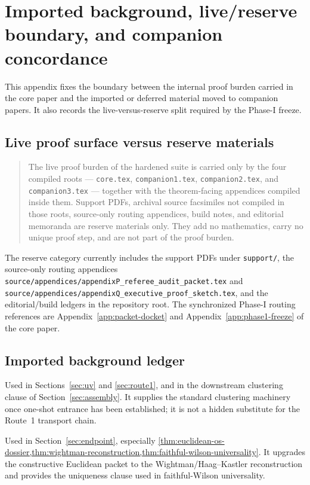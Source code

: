 
\section{Imported background, live/reserve boundary, and companion concordance}\label{app:ledger-concordance}

This appendix fixes the boundary between the internal proof burden carried in the core paper and the imported or deferred material moved to companion papers. It also records the live-versus-reserve split required by the Phase-I freeze.

\subsection*{Live proof surface versus reserve materials}

\begin{quote}\small
The live proof burden of the hardened suite is carried only by the four compiled roots --- \texttt{core.tex}, \texttt{companion1.tex}, \texttt{companion2.tex}, and \texttt{companion3.tex} --- together with the theorem-facing appendices compiled inside them. Support PDFs, archival source facsimiles not compiled in those roots, source-only routing appendices, build notes, and editorial memoranda are reserve materials only. They add no mathematics, carry no unique proof step, and are not part of the proof burden.
\end{quote}

The reserve category currently includes the support PDFs under \texttt{support/}, the source-only routing appendices \texttt{source/appendices/appendixP\_referee\_audit\_packet.tex} and \texttt{source/appendices/appendixQ\_executive\_proof\_sketch.tex}, and the editorial/build ledgers in the repository root. The synchronized Phase-I routing references are Appendix~\ref{app:packet-docket} and Appendix~\ref{app:phase1-freeze} of the core paper.

\subsection*{Imported background ledger}
\begin{description}[leftmargin=2.2em,style=nextline]
\item[KP/Dobrushin entrance-to-clustering package.] Used in Sections~\ref{sec:uv} and \ref{sec:route1}, and in the downstream clustering clause of Section~\ref{sec:assembly}. It supplies the standard clustering machinery once one-shot entrance has been established; it is not a hidden substitute for the Route~1 transport chain.
\item[Standard OS reconstruction / analytic continuation / uniqueness theorem family.] Used in Section~\ref{sec:endpoint}, especially \cref{thm:euclidean-os-dossier,thm:wightman-reconstruction,thm:faithful-wilson-universality}. It upgrades the constructive Euclidean packet to the Wightman/Haag--Kastler reconstruction and provides the uniqueness clause used in faithful-Wilson universality.
\end{description}


